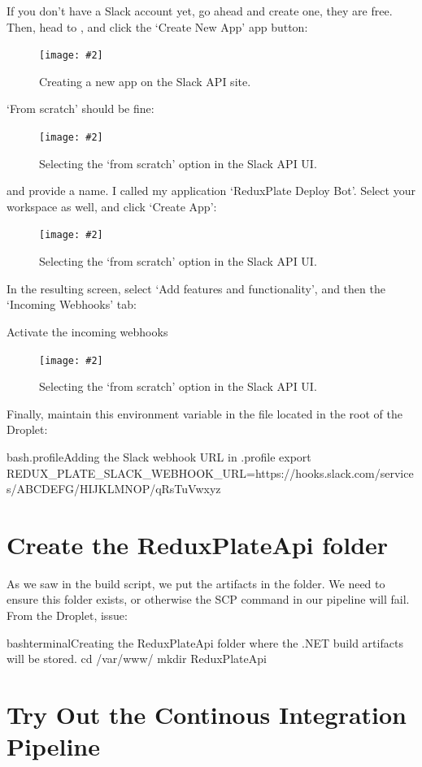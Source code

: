\documentclass[paper=6in:9in,pagesize=pdftex,headinclude=on,footinclude=on,12pt,twoside]{scrbook}
\newcommand{\standardfigure}[3]{\begin{figure}[H]\begin{center}\texttt{[image: \#2]}\caption{#3}\label{fig:#2}\end{center}\end{figure}}
\begin{document}
If you don't have a Slack account yet, go ahead and create one, they are free. Then, head to , and click the `Create New App' app button:

\standardfigure{\textwidth}{/backend/slack/create-new-app}{Creating a new app on the Slack API site.}

`From scratch' should be fine:

\standardfigure{\textwidth}{/backend/slack/from-scratch}{Selecting the `from scratch' option in the Slack API UI.}

and provide a name. I called my application `ReduxPlate Deploy Bot'. Select your workspace as well, and click `Create App':

\standardfigure{\textwidth}{/backend/slack/application-values}{Selecting the `from scratch' option in the Slack API UI.}

In the resulting screen, select `Add features and functionality', and then the `Incoming Webhooks' tab:

Activate the incoming webhooks

\standardfigure{\textwidth}{/backend/slack/application-values}{Selecting the `from scratch' option in the Slack API UI.}

Finally, maintain this environment variable in the  file located in the root of the Droplet:

\begin{codeInput}{bash}{.profile}{Adding the Slack webhook URL in .profile}
export REDUX_PLATE_SLACK_WEBHOOK_URL=https://hooks.slack.com/services/ABCDEFG/HIJKLMNOP/qRsTuVwxyz
\end{codeInput}

\section{Create the ReduxPlateApi folder}

As we saw in the build script, we put the artifacts in the  folder. We need to ensure this folder exists, or otherwise the SCP command in our pipeline will fail. From the Droplet, issue:

\begin{codeInput}{bash}{terminal}{Creating the ReduxPlateApi folder where the .NET build artifacts will be stored.}
cd /var/www/
mkdir ReduxPlateApi
\end{codeInput}

\section{Try Out the Continous Integration Pipeline}
\end{document}

